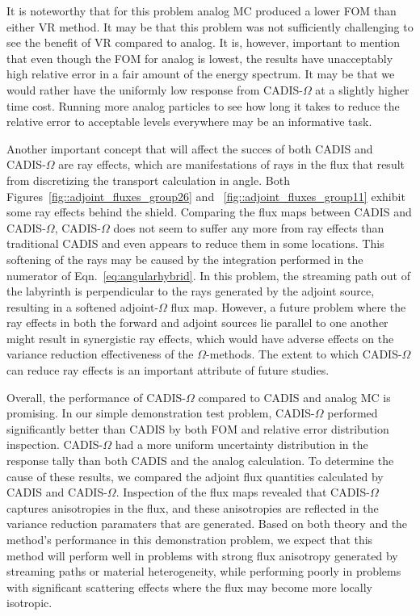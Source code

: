 \documentclass[12pt]{article}
\begin{document}
It is noteworthy that for this problem analog MC produced a lower FOM than either VR method. 
It may be that this problem was not sufficiently challenging to see the benefit of VR compared to analog. 
It is, however, important to mention that even though the FOM for analog is lowest, the results have unacceptably high relative error in a fair amount of the energy spectrum. 
It may be that we would rather have the uniformly low response from CADIS-$\Omega$ at a slightly higher time cost.
Running more analog particles to see how long it takes to reduce the relative error to acceptable levels everywhere may be an informative task. 

Another important concept that will affect the succes of both CADIS and CADIS-$\Omega$ are ray effects, which are manifestations of rays in the flux that result from discretizing the transport calculation in angle. Both Figures~\ref{fig::adjoint_fluxes_group26} and ~\ref{fig::adjoint_fluxes_group11} exhibit some ray effects behind the shield. Comparing the flux maps between CADIS and  CADIS-$\Omega$, CADIS-$\Omega$ does not seem to suffer any more from ray effects than traditional CADIS and even appears to reduce them in some locations. This softening of the rays may be caused by the integration performed in the numerator of Eqn.~\eqref{eq:angularhybrid}. In this problem, the streaming path out of the labyrinth is perpendicular to the rays generated by the adjoint source, resulting in a softened adjoint-$\Omega$ flux map. However, a future problem where the ray effects in both the forward and adjoint sources lie parallel to one another might result in synergistic ray effects, which would have adverse effects on the variance reduction effectiveness of the $\Omega$-methods. The extent to which CADIS-$\Omega$ can reduce ray effects is an important attribute of future studies.

Overall, the performance of CADIS-$\Omega$ compared to CADIS and analog MC is promising. In our simple demonstration test problem, CADIS-$\Omega$ performed significantly better than CADIS by both FOM and relative error distribution inspection. CADIS-$\Omega$ had a more uniform uncertainty distribution in the response tally than both CADIS and the analog calculation. To determine the cause of these results, we compared the adjoint flux quantities calculated by CADIS and CADIS-$\Omega$. Inspection of the flux maps revealed that CADIS-$\Omega$ captures anisotropies in the flux, and these anisotropies are reflected in the variance reduction paramaters that are generated. Based on both theory and the method's performance in this demonstration problem, we expect that this method will perform well in problems with strong flux anisotropy generated by streaming paths or material heterogeneity, while performing poorly in problems with significant scattering effects where the flux may become more locally isotropic. 
 
\end{document}
